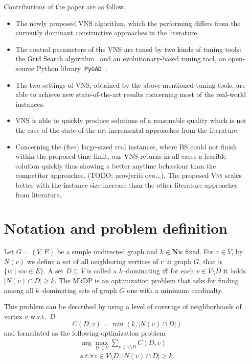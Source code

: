 \documentclass[dvipsnames,format=sigconf,anonymous=true,review=true]{acmart}
\begin{document}
Contributions of the paper are as follow.
\begin{itemize}
	\item The newly proposed VNS algorithm, which the performing differs from  the currently dominant constructive approaches in the literature.
	
	
	\item The control parameters of the VNS are tuned by two kinds of tuning tools: the Grid Search algorithm~\cite{ranjan2019k} and an evolutionary-based tuning tool, an open-source Python library~\texttt{PyGAD}~\cite{gad2021pygad}.  
	\item The two settings of VNS, obtained by the above-mentioned tuning tools, are able to achieve new state-of-the-art results concerning most of the real-world instances. %
	\item VNS is able to quickly produce solutions of a reasonable quality which is not the case of the state-of-the-art incremental approaches from the literature.
	\item Concerning the (five) large-sized real instances, where BS could not finish within the proposed time limit, our VNS returns  in all cases a feasible solution quickly thus showing a better anytime behaviour than the competitor approaches. (TODO: provjeriti ovo...). The proposed \textsc{Vns} scales better with the instance size increase than the other literature approaches from literature. 
\end{itemize}

\section{Notation and problem definition }
    

    Let $G=(V,E)$ be a simple undirected graph and $k \in \mathbf{N}$is fixed. For $v\in V$, by $N(v)$ we define a set of all neighboring vertices of $v$ in graph  $G$, that is $\{w \mid uw \in E\}$. A set $D \subseteq V$ is called a $k$--dominating iff for each $v\in V \setminus D$ it holds $|N(v) \cap D| \geq k$.  The MkDP is an optimization problem that asks for finding among all $k$--dominating sets of graph $G$ one with a minimum cardinalty. 
    
    
    This problem can be described by using a level of coverage of neighborhoods of vertex $v$ w.r.t.\ $D$
    \begin{equation}
    	C(D, v) = \min(k, |N(v) \cap D|)
    \end{equation}
and  formulated as the following optimization problem 
\begin{align}
    \arg \max_{D \subset V } \sum_{v \in V\setminus D} C(D,v) \\
    s.t. \forall v \in V \setminus D, |N(v) \cap D| \geq k.
\end{align}
    
\end{document}
